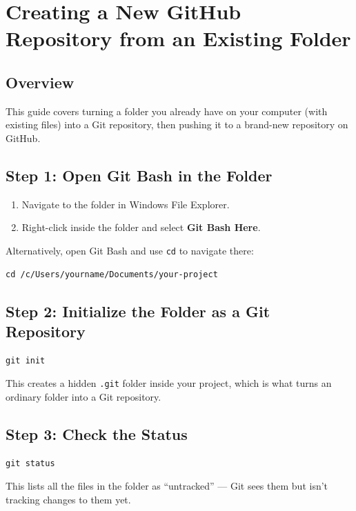 \documentclass[main.tex]{subfiles}
\begin{document}
\section{Creating a New GitHub Repository from an Existing Folder}

\subsection{Overview}
This guide covers turning a folder you already have on your
computer (with existing files) into a Git repository, then
pushing it to a brand-new repository on GitHub.

\subsection{Step 1: Open Git Bash in the Folder}
\begin{enumerate}[leftmargin=*]
    \item Navigate to the folder in Windows File Explorer.
    \item Right-click inside the folder and select
    \textbf{Git Bash Here}.
\end{enumerate}

Alternatively, open Git Bash and use \texttt{cd} to navigate there:

\begin{lstlisting}
cd /c/Users/yourname/Documents/your-project
\end{lstlisting}

\subsection{Step 2: Initialize the Folder as a Git Repository}
\begin{lstlisting}
git init
\end{lstlisting}

This creates a hidden \texttt{.git} folder inside your project,
which is what turns an ordinary folder into a Git repository.

\subsection{Step 3: Check the Status}
\begin{lstlisting}
git status
\end{lstlisting}

This lists all the files in the folder as ``untracked'' — Git
sees them but isn't tracking changes to them yet.
\end{document}
